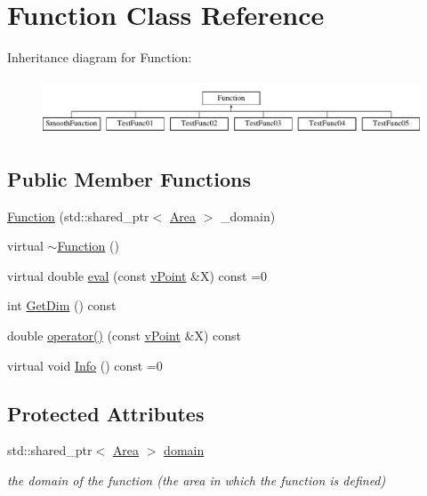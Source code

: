 \hypertarget{class_function}{}\section{Function Class Reference}
\label{class_function}
Inheritance diagram for Function\+:\begin{figure}[H]
\begin{center}
\leavevmode
\includegraphics[height=1.696970cm]{class_function}
\end{center}
\end{figure}
\subsection*{Public Member Functions}
\begin{DoxyCompactItemize}
\item 
\hyperlink{class_function_a28c4db5ca9f2bbe27fd51ed0169bd2de}{Function} (std\+::shared\+\_\+ptr$<$ \hyperlink{class_area}{Area} $>$ \+\_\+domain)
\item 
virtual \hyperlink{class_function_a8697b2e490a4314a7ccbb17aea8ce537}{$\sim$\+Function} ()
\item 
virtual double \hyperlink{class_function_a8b9d55271a531b6f5bef09bfae0a23d9}{eval} (const \hyperlink{classv_point}{v\+Point} \&X) const =0
\item 
int \hyperlink{class_function_a531e81f5d7f7cafce7c211c08c3c7041}{Get\+Dim} () const
\item 
double \hyperlink{class_function_acc67abadb0c13fbe3a0cc96c65f2b55b}{operator()} (const \hyperlink{classv_point}{v\+Point} \&X) const
\item 
virtual void \hyperlink{class_function_a6915be18a065224ed73b1288c6125948}{Info} () const =0
\end{DoxyCompactItemize}
\subsection*{Protected Attributes}
\begin{DoxyCompactItemize}
\item 
\mbox{\label{class_function_a809df8b9c6dc40e7853e96efa4756881}} 
std\+::shared\+\_\+ptr$<$ \hyperlink{class_area}{Area} $>$ \hyperlink{class_function_a809df8b9c6dc40e7853e96efa4756881}{domain}
\begin{DoxyCompactList}\small\item\em the domain of the function (the area in which the function is defined) \end{DoxyCompactList}\end{DoxyCompactItemize}
